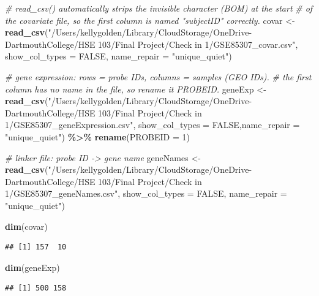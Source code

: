 \documentclass[
]{article}
\newenvironment{Shaded}{\begin{snugshade}}{\end{snugshade}}
\newcommand{\AttributeTok}[1]{\textcolor[rgb]{0.13,0.29,0.53}{#1}}
\newcommand{\CommentTok}[1]{\textcolor[rgb]{0.56,0.35,0.01}{\textit{#1}}}
\newcommand{\ConstantTok}[1]{\textcolor[rgb]{0.56,0.35,0.01}{#1}}
\newcommand{\DecValTok}[1]{\textcolor[rgb]{0.00,0.00,0.81}{#1}}
\newcommand{\FunctionTok}[1]{\textcolor[rgb]{0.13,0.29,0.53}{\textbf{#1}}}
\newcommand{\NormalTok}[1]{#1}
\newcommand{\OtherTok}[1]{\textcolor[rgb]{0.56,0.35,0.01}{#1}}
\newcommand{\SpecialCharTok}[1]{\textcolor[rgb]{0.81,0.36,0.00}{\textbf{#1}}}
\newcommand{\StringTok}[1]{\textcolor[rgb]{0.31,0.60,0.02}{#1}}
\begin{document}
\begin{Shaded}
\begin{Highlighting}[]
\CommentTok{\# read\_csv() automatically strips the invisible character (BOM) at the start}
\CommentTok{\# of the covariate file, so the first column is named "subjectID" correctly.}
\NormalTok{covar }\OtherTok{\textless{}{-}} \FunctionTok{read\_csv}\NormalTok{(}\StringTok{"/Users/kellygolden/Library/CloudStorage/OneDrive{-}DartmouthCollege/HSE 103/Final Project/Check in 1/GSE85307\_covar.csv"}\NormalTok{, }\AttributeTok{show\_col\_types =} \ConstantTok{FALSE}\NormalTok{, }\AttributeTok{name\_repair =} \StringTok{"unique\_quiet"}\NormalTok{)}

\CommentTok{\# gene expression: rows = probe IDs, columns = samples (GEO IDs).}
\CommentTok{\# the first column has no name in the file, so rename it PROBEID.}
\NormalTok{geneExp }\OtherTok{\textless{}{-}} \FunctionTok{read\_csv}\NormalTok{(}\StringTok{"/Users/kellygolden/Library/CloudStorage/OneDrive{-}DartmouthCollege/HSE 103/Final Project/Check in 1/GSE85307\_geneExpression.csv"}\NormalTok{, }\AttributeTok{show\_col\_types =} \ConstantTok{FALSE}\NormalTok{,}\AttributeTok{name\_repair =} \StringTok{"unique\_quiet"}\NormalTok{) }\SpecialCharTok{\%\textgreater{}\%}
  \FunctionTok{rename}\NormalTok{(}\AttributeTok{PROBEID =} \DecValTok{1}\NormalTok{)}

\CommentTok{\# linker file: probe ID {-}\textgreater{} gene name}
\NormalTok{geneNames }\OtherTok{\textless{}{-}} \FunctionTok{read\_csv}\NormalTok{(}\StringTok{"/Users/kellygolden/Library/CloudStorage/OneDrive{-}DartmouthCollege/HSE 103/Final Project/Check in 1/GSE85307\_geneNames.csv"}\NormalTok{, }\AttributeTok{show\_col\_types =} \ConstantTok{FALSE}\NormalTok{, }\AttributeTok{name\_repair =} \StringTok{"unique\_quiet"}\NormalTok{)}

\FunctionTok{dim}\NormalTok{(covar)}
\end{Highlighting}
\end{Shaded}

\begin{verbatim}
## [1] 157  10
\end{verbatim}

\begin{Shaded}
\begin{Highlighting}[]
\FunctionTok{dim}\NormalTok{(geneExp)   }
\end{Highlighting}
\end{Shaded}

\begin{verbatim}
## [1] 500 158
\end{verbatim}
\end{document}
